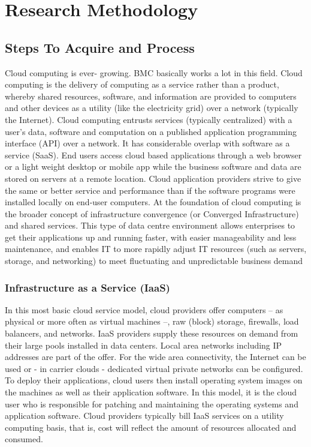 \chapter{Research Methodology}

\section{Steps To Acquire and Process}

  Cloud computing is ever- growing. BMC basically works a lot in this field. Cloud computing is the delivery of computing as a service rather than a product, whereby shared resources, software, and information are provided to computers and other devices as a utility (like the electricity grid) over a network (typically the Internet).
Cloud computing entrusts services (typically centralized) with a user's data, software and computation on a published application programming interface (API) over a network. It has considerable overlap with software as a service (SaaS).
End users access cloud based applications through a web browser or a light weight desktop or mobile app while the business software and data are stored on servers at a remote location. Cloud application providers strive to give the same or better service and performance than if the software programs were installed locally on end-user computers.
At the foundation of cloud computing is the broader concept of infrastructure convergence (or Converged Infrastructure) and shared services. This type of data centre environment allows enterprises to get their applications up and running faster, with easier manageability and less maintenance, and enables IT to more rapidly adjust IT resources (such as servers, storage, and networking) to meet fluctuating and unpredictable business demand

\subsection{Infrastructure as a Service (IaaS)}

In this most basic cloud service model, cloud providers offer computers – as physical or more often as virtual machines –, raw (block) storage, firewalls, load balancers, and networks. IaaS providers supply these resources on demand from their large pools installed in data centers. Local area networks including IP addresses are part of the offer. For the wide area connectivity, the Internet can be used or - in carrier clouds - dedicated virtual private networks can be configured.
To deploy their applications, cloud users then install operating system images on the machines as well as their application software. In this model, it is the cloud user who is responsible for patching and maintaining the operating systems and application software. Cloud providers typically bill IaaS services on a utility computing basis, that is, cost will reflect the amount of resources allocated and consumed.


